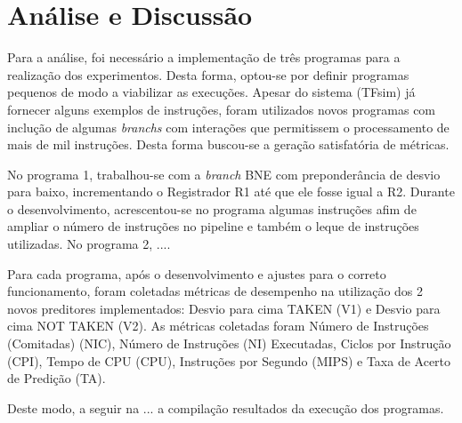 \documentclass[12pt]{article}
\begin{document}
\section{Análise e Discussão}

Para a análise, foi necessário a implementação de três programas para a realização dos experimentos. Desta forma, optou-se por definir programas pequenos de modo a viabilizar as execuções. Apesar do sistema (TFsim) já fornecer alguns exemplos de instruções, foram utilizados novos programas com inclução de algumas \textit{branchs} com interações que permitissem o processamento de mais de mil instruções. Desta forma buscou-se a geração satisfatória de métricas.

No programa 1, trabalhou-se com a \textit{branch} BNE com preponderância de desvio para baixo, incrementando o Registrador R1 até que ele fosse igual a R2. Durante o desenvolvimento, acrescentou-se no programa algumas instruções afim de ampliar o número de instruções no pipeline e também o leque de instruções utilizadas. No programa 2,
....

Para cada programa, após o desenvolvimento e ajustes para o correto funcionamento, foram coletadas métricas de desempenho na utilização dos 2 novos preditores implementados: Desvio para cima TAKEN (V1) e Desvio para cima NOT TAKEN (V2). As métricas coletadas foram Número de Instruções (Comitadas) (NIC), Número de Instruções (NI) Executadas, Ciclos por Instrução (CPI), Tempo de CPU (CPU), Instruções por Segundo (MIPS) e Taxa de Acerto de Predição (TA).

Deste modo, a seguir na ... a compilação resultados da execução dos programas.
\end{document}
